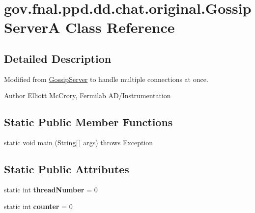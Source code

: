 \hypertarget{classgov_1_1fnal_1_1ppd_1_1dd_1_1chat_1_1original_1_1GossipServerA}{\section{gov.\-fnal.\-ppd.\-dd.\-chat.\-original.\-Gossip\-Server\-A Class Reference}
\label{classgov_1_1fnal_1_1ppd_1_1dd_1_1chat_1_1original_1_1GossipServerA}
}


\subsection{Detailed Description}
Modified from \hyperlink{classgov_1_1fnal_1_1ppd_1_1dd_1_1chat_1_1original_1_1GossipServer}{Gossip\-Server} to handle multiple connections at once.

\begin{DoxyAuthor}{Author}
Elliott Mc\-Crory, Fermilab A\-D/\-Instrumentation 
\end{DoxyAuthor}
\subsection*{Static Public Member Functions}
\begin{DoxyCompactItemize}
\item 
static void \hyperlink{classgov_1_1fnal_1_1ppd_1_1dd_1_1chat_1_1original_1_1GossipServerA_a46abdc4798bd0f2cefa9085bdebd0229}{main} (String\mbox{[}$\,$\mbox{]} args)  throws Exception 
\end{DoxyCompactItemize}
\subsection*{Static Public Attributes}
\begin{DoxyCompactItemize}
\item 
\hypertarget{classgov_1_1fnal_1_1ppd_1_1dd_1_1chat_1_1original_1_1GossipServerA_a4a676478d98fd09ff72e452da6eefc7f}{static int {\bfseries thread\-Number} = 0}\label{classgov_1_1fnal_1_1ppd_1_1dd_1_1chat_1_1original_1_1GossipServerA_a4a676478d98fd09ff72e452da6eefc7f}

\item 
\hypertarget{classgov_1_1fnal_1_1ppd_1_1dd_1_1chat_1_1original_1_1GossipServerA_a7028f4794e09c2b9fbf294ef563ac64e}{static int {\bfseries counter} = 0}\label{classgov_1_1fnal_1_1ppd_1_1dd_1_1chat_1_1original_1_1GossipServerA_a7028f4794e09c2b9fbf294ef563ac64e}

\end{DoxyCompactItemize}


